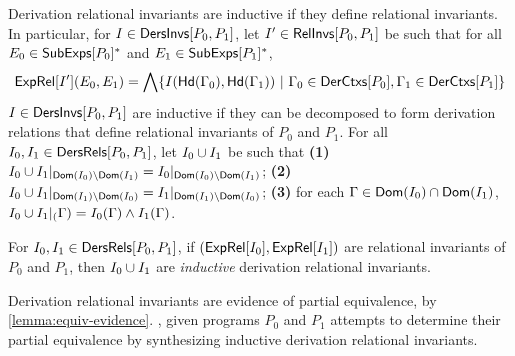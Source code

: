 Derivation relational invariants are inductive if they define
relational invariants.
%
In particular, for $I \in \mathsf{DersInvs}[ P_0, P_1 ]$, let $I' \in
\mathsf{RelInvs}[ P_0, P_1 ]$ be such that for all $E_0 \in \mathsf{SubExps}[ P_0 ]^{*}$
and $E_1 \in \mathsf{SubExps}[ P_1 ]^{*}$,
\begin{align*}
  \exprel{I'}(E_0, E_1) = %
  \bigland \setformer{ I(\headexps(\Gamma_0), \headexps(\Gamma_1)) }{ %
    \Gamma_0 \in \derctxs{ P_0 }, \Gamma_1 \in \derctxs{ P_1 } } 
\end{align*}
%
$I \in \mathsf{DersInvs}[ P_0, P_1 ]$ are inductive if they can be decomposed to
form derivation relations that define relational invariants of $P_0$
and $P_1$.
%
For all $I_0, I_1 \in \mathsf{DersRels}[ P_0, P_1 ]$, let $I_0 \cup I_1$ 
be such that 
\textbf{(1)} $I_0 \cup I_1|_{\mathsf{Dom}(I_0) \setminus
  \mathsf{Dom}(I_1)} = I_0|_{\mathsf{Dom}(I_0) \setminus \mathsf{Dom}(I_1)}$;
\textbf{(2)} $I_0 \cup I_1|_{\mathsf{Dom}(I_1) \setminus
  \mathsf{Dom}(I_0)} = I_1|_{\mathsf{Dom}(I_1) \setminus
  \mathsf{Dom}(I_0)}$;
\textbf{(3)} for each $\Gamma \in \mathsf{Dom}(I_0) \cap
\mathsf{Dom}(I_1)$, $I_0 \cup I_1|_{(}\Gamma) = I_0(\Gamma) \land
I_1(\Gamma)$.
%
\begin{defn}
  \label{defn:inductive-der-rels}
  For $I_0, I_1 \in \mathsf{DersRels}[ P_0, P_1 ]$, if $(\mathsf{ExpRel}[ I_0 ],
  \mathsf{ExpRel}[ I_1 ])$ are relational invariants of $P_0$ and $P_1$, then
  $I_0 \cup I_1$ are \emph{inductive} derivation relational
  invariants.
\end{defn}
%
Derivation relational invariants are evidence of partial equivalence,
by \autoref{lemma:equiv-evidence}.
%
\sys, given programs $P_0$ and $P_1$ attempts to determine their
partial equivalence by synthesizing inductive derivation relational
invariants.

